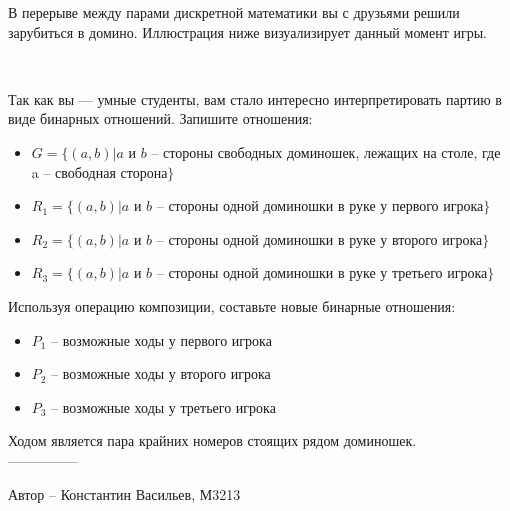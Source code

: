 \question
В перерыве между парами дискретной математики вы с друзьями решили зарубиться в домино. Иллюстрация ниже визуализирует данный момент игры.

\\
\begin{figure}[h]

\begin{minipage}[h]{0.55\linewidth}
\end{minipage}
\begin{minipage}[h]{0.45\linewidth}
\end{minipage}
\end{figure}

Так как вы — умные студенты, вам стало интересно интерпретировать партию в виде бинарных отношений. Запишите отношения:
\begin{itemize}
    \item $G = \{(a,b)|a$ и $b$ – стороны свободных доминошек, лежащих на столе, где a – свободная сторона$\}$
    \item $R_1 = \{(a,b)|a$ и $b$ – стороны одной доминошки в руке у первого игрока$\}$
    \item $R_2 = \{(a,b)|a$ и $b$ – стороны одной доминошки в руке у второго игрока$\}$
    \item $R_3 = \{(a,b)|a$ и $b$ – стороны одной доминошки в руке у третьего игрока$\}$
\end{itemize}

Используя операцию композиции, составьте новые бинарные отношения:
\begin{itemize}
    \item $P_1$ – возможные ходы у первого игрока
    \item $P_2$ – возможные ходы у второго игрока
    \item $P_3$ – возможные ходы у третьего игрока
\end{itemize}


Ходом является пара крайних номеров стоящих рядом доминошек.
\\
---------------

Автор -- Константин Васильев, М3213
